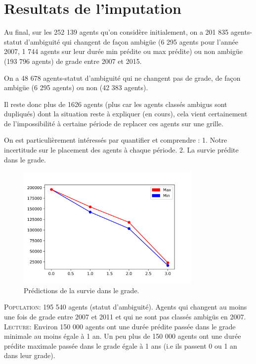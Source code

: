 \documentclass[11pt,a4paper]{article}
\begin{document}
\section{Resultats de l'imputation}

Au final, sur les 252 139 agents qu'on considère initialement, on a 201 835 agents-statut d'ambiguité qui changent de façon ambigüe (6 295 agents pour l'année 2007, 1 744 agents sur leur durée min prédite ou max prédite) ou non ambigüe (193 796 agents) de grade entre 2007 et 2015.
\bigskip

On a 48 678 agents-statut d'ambiguité qui ne changent pas de grade, de façon ambigüe (6 295 agents) ou non (42 383 agents).

\bigskip
Il reste donc plus de 1626 agents (plus car les agents classés ambigus sont dupliqués) dont la situation reste à expliquer (en cours), cela vient certainement de l'impossibilité à certaine période de replacer ces agents sur une grille.

\bigskip
On est particulièrement intéressés par quantifier et comprendre :
1. Notre incertitude sur le placement des agents à chaque période.
2. La survie prédite dans le grade.


\begin{figure}[H] 
	\caption{Prédictions de la survie dans le grade.}
	\label{transit1} 
	\includegraphics[width=0.80\textwidth]{effectifs_cumules_durees_maximales_minimales_qd_ib_NaN_traite_comme_chgmt_grade.png} 
\end{figure}
\begin{minipage}{15cm}
	\footnotesize
	\textsc{Population:} 195 540 agents (statut d'ambiguité). Agents qui changent au moins une fois de grade entre 2007 et 2011 et qui ne sont pas classés ambigüs en 2007. \\
	\textsc{Lecture:} Environ 150 000 agents ont une durée prédite passée dans le grade minimale au moins égale à 1 an. Un peu plus de 150 000 agents ont une durée prédite maximale passée dans le grade égale à 1 ans (i.e ils passent 0 ou 1 an dans leur grade).
\end{minipage}
\end{document}
